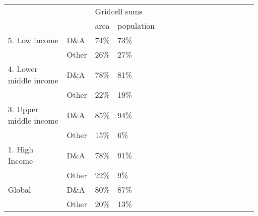 \begin{tabular}{ll p{1cm} p{1cm} p{1cm} p{1cm} p{1cm} p{1cm} p{1cm} p{1cm} p{1cm} p{1cm} p{1cm} p{1cm} p{1cm} p{1cm}}
\toprule
       &       & \multicolumn{2}{L{2cm}}{Gridcell sums} \\
       &       &          area & population \\
\midrule
5. Low income & D\&A &          74\% &       73\% \\
       & Other &          26\% &       27\% \\
4. Lower middle income & D\&A &          78\% &       81\% \\
       & Other &          22\% &       19\% \\
3. Upper middle income & D\&A &          85\% &       94\% \\
       & Other &          15\% &        6\% \\
1. High Income & D\&A &          78\% &       91\% \\
       & Other &          22\% &        9\% \\
Global & D\&A &          80\% &       87\% \\
       & Other &          20\% &       13\% \\
\bottomrule
\end{tabular}
